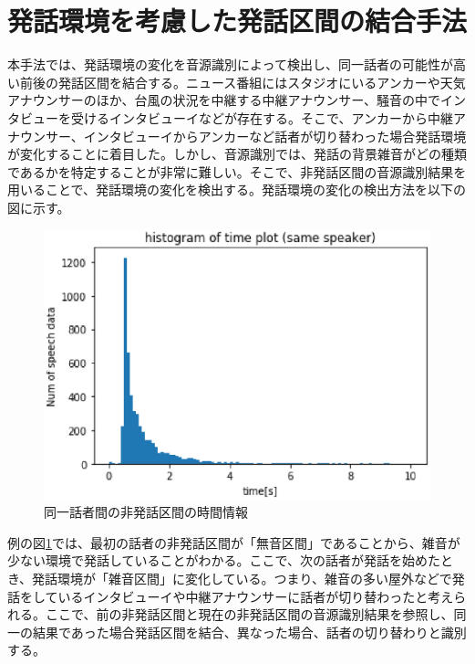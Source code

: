 \section{発話環境を考慮した発話区間の結合手法}
本手法では、発話環境の変化を音源識別によって検出し、同一話者の可能性が高い前後の発話区間を結合する。ニュース番組にはスタジオにいるアンカーや天気アナウンサーのほか、台風の状況を中継する中継アナウンサー、騒音の中でインタビューを受けるインタビューイなどが存在する。そこで、アンカーから中継アナウンサー、インタビューイからアンカーなど話者が切り替わった場合発話環境が変化することに着目した。しかし、音源識別では、発話の背景雑音がどの種類であるかを特定することが非常に難しい。そこで、非発話区間の音源識別結果を用いることで、発話環境の変化を検出する。発話環境の変化の検出方法を以下の図に示す。\par

\begin{figure}[htb]
  \begin{center}
    \includegraphics{./figure/same_sp.eps}
  \end{center}
  \caption{同一話者間の非発話区間の時間情報 \label{fig:flow_prob2}}
\end{figure}

例の図\ref{fig:flow_prob2}では、最初の話者の非発話区間が「無音区間」であることから、雑音が少ない環境で発話していることがわかる。ここで、次の話者が発話を始めたとき、発話環境が「雑音区間」に変化している。つまり、雑音の多い屋外などで発話をしているインタビューイや中継アナウンサーに話者が切り替わったと考えられる。ここで、前の非発話区間と現在の非発話区間の音源識別結果を参照し、同一の結果であった場合発話区間を結合、異なった場合、話者の切り替わりと識別する。

